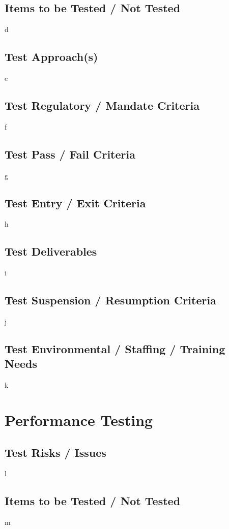 \documentclass{article}
\begin{document}
\subsection{Items to be Tested / Not Tested}
d

\subsection{Test Approach(s)}
e

\subsection{Test Regulatory / Mandate Criteria}
f

\subsection{Test Pass / Fail Criteria}
g

\subsection{Test Entry / Exit Criteria}
h

\subsection{Test Deliverables}
i

\subsection{Test Suspension / Resumption Criteria}
j

\subsection{Test Environmental / Staffing / Training Needs}
k

\section{Performance Testing}
\subsection{Test Risks / Issues}
l

\subsection{Items to be Tested / Not Tested}
m
\end{document}
